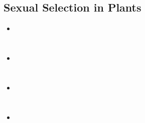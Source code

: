 \documentclass[12pt,a4paper]{article}
\begin{document}
\subsection{Sexual Selection in Plants}
\begin{itemize}
    \item 
\end{itemize}


\clearpage
\section{}
\subsection{}
\begin{itemize}
    \item 
\end{itemize}

\clearpage
\section{}
\subsection{}
\begin{itemize}
    \item 
\end{itemize}

\clearpage
\section{}
\subsection{}
\begin{itemize}
    \item 
\end{itemize}
\end{document}
